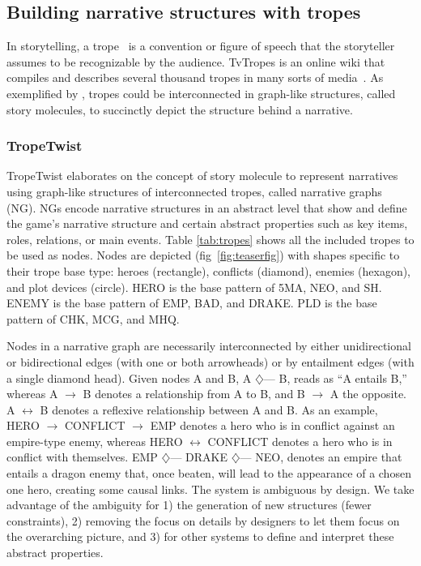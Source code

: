 \subsection{Building narrative structures with tropes}

In storytelling, a trope~ is a convention or figure of speech that the storyteller assumes to be recognizable by the audience. TvTropes is an online wiki that compiles and describes several thousand tropes in many sorts of media~. As exemplified by , tropes could be interconnected in graph-like structures, called story molecules, to succinctly depict the structure behind a narrative. 

\subsubsection{TropeTwist}

TropeTwist elaborates on the concept of story molecule to represent narratives using graph-like structures of interconnected tropes, called narrative graphs (NG). NGs encode narrative structures in an abstract level that show and define the game's narrative structure and certain abstract properties such as key items, roles, relations, or main events. Table \ref{tab:tropes} shows all the included tropes to be used as nodes. Nodes are depicted (fig~\ref{fig:teaserfig}) with shapes specific to their trope base type: heroes (rectangle), conflicts (diamond), enemies (hexagon), and plot devices (circle). HERO is the base pattern of 5MA, NEO, and SH. ENEMY is the base pattern of EMP, BAD, and DRAKE. PLD is the base pattern of CHK, MCG, and MHQ.

Nodes in a narrative graph are necessarily interconnected by either unidirectional or bidirectional edges (with one or both arrowheads) or by entailment edges (with a single diamond head). Given nodes A and B, A $\diamondsuit$--- B, reads as ``A entails B,'' whereas A $\rightarrow$ B denotes a relationship from A to B, and B $\rightarrow$ A the opposite. A $\leftrightarrow$ B denotes a reflexive relationship between A and B. As an example, HERO $\rightarrow$ CONFLICT $\rightarrow$ EMP denotes a hero who is in conflict against an empire-type enemy, whereas HERO $\leftrightarrow$ CONFLICT denotes a hero who is in conflict with themselves. EMP $\diamondsuit$--- DRAKE $\diamondsuit$--- NEO, denotes an empire that entails a dragon enemy that, once beaten, will lead to the appearance of a chosen one hero, creating some causal links. The system is ambiguous by design. We take advantage of the ambiguity for 1) the generation of new structures (fewer constraints), 2) removing the focus on details by designers to let them focus on the overarching picture, and 3) for other systems to define and interpret these abstract properties. 

